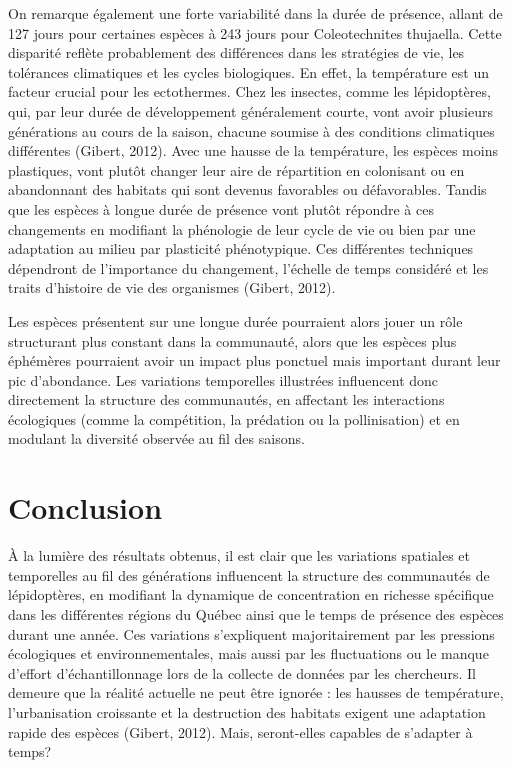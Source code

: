 \documentclass[9pt,twocolumn,twoside,]{pnas-new}
\begin{document}
On remarque également une forte variabilité dans la durée de présence,
allant de 127 jours pour certaines espèces à 243 jours pour
Coleotechnites thujaella. Cette disparité reflète probablement des
différences dans les stratégies de vie, les tolérances climatiques et
les cycles biologiques. En effet, la température est un facteur crucial
pour les ectothermes. Chez les insectes, comme les lépidoptères, qui,
par leur durée de développement généralement courte, vont avoir
plusieurs générations au cours de la saison, chacune soumise à des
conditions climatiques différentes (Gibert, 2012). Avec une hausse de la
température, les espèces moins plastiques, vont plutôt changer leur aire
de répartition en colonisant ou en abandonnant des habitats qui sont
devenus favorables ou défavorables. Tandis que les espèces à longue
durée de présence vont plutôt répondre à ces changements en modifiant la
phénologie de leur cycle de vie ou bien par une adaptation au milieu par
plasticité phénotypique. Ces différentes techniques dépendront de
l'importance du changement, l'échelle de temps considéré et les traits
d'histoire de vie des organismes (Gibert, 2012).

Les espèces présentent sur une longue durée pourraient alors jouer un
rôle structurant plus constant dans la communauté, alors que les espèces
plus éphémères pourraient avoir un impact plus ponctuel mais important
durant leur pic d'abondance. Les variations temporelles illustrées
influencent donc directement la structure des communautés, en affectant
les interactions écologiques (comme la compétition, la prédation ou la
pollinisation) et en modulant la diversité observée au fil des saisons.

\section*{Conclusion}\label{conclusion}

À la lumière des résultats obtenus, il est clair que les variations
spatiales et temporelles au fil des générations influencent la structure
des communautés de lépidoptères, en modifiant la dynamique de
concentration en richesse spécifique dans les différentes régions du
Québec ainsi que le temps de présence des espèces durant une année. Ces
variations s'expliquent majoritairement par les pressions écologiques et
environnementales, mais aussi par les fluctuations ou le manque d'effort
d'échantillonnage lors de la collecte de données par les chercheurs. Il
demeure que la réalité actuelle ne peut être ignorée : les hausses de
température, l'urbanisation croissante et la destruction des habitats
exigent une adaptation rapide des espèces (Gibert, 2012). Mais,
seront-elles capables de s'adapter à temps?
\end{document}
